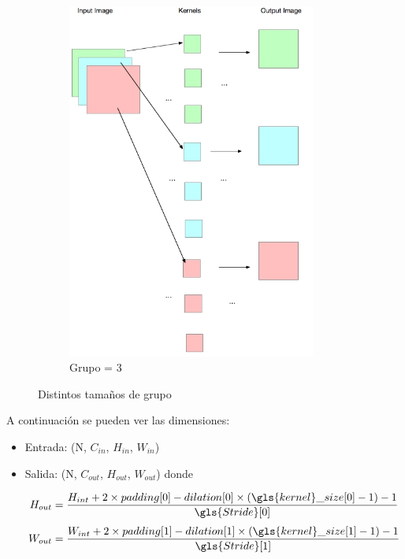 \begin{itemize}
\begin{figure}[H]
\begin{subfigure}{.33\textwidth}
    \includegraphics[width =0.9\textwidth]{images/group/g3.jpg}
  \caption{Grupo = 3}
  \label{fig:sfig2}
\end{subfigure}
\caption{Distintos tamaños de grupo}
\label{fig:convolucionGrupos}
\end{figure}
\end{itemize}
    
A continuación se pueden ver las dimensiones:
\begin{itemize}
    \item Entrada: (N, $C_{in}$, $H_{in}$, $W_{in}$)

    \item    Salida: (N, $C_{out}$, $H_{out}$, $W_{out}$) donde
       
        \begin{equation}
            H_{out}= \frac{H_{int}+2\times padding[0]-dilation[0]\times (\gls{kernel}\_ size[0]-1)-1}{\gls{Stride}[0]} 
        \end{equation}
        \begin{equation}
            W_{out}= \frac{W_{int}+2\times padding[1]-dilation[1]\times (\gls{kernel}\_ size[1]-1)-1}{\gls{Stride}[1]} 
        \end{equation}
 
\end{itemize}

